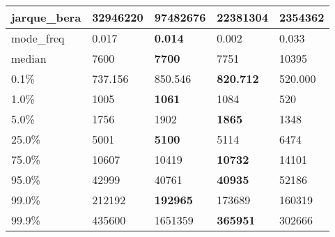 \begin{table}[H]
\begin{tabular}{|l|m{10em}|m{10em}|m{10em}|m{10em}|}
\hline jarque\_bera & 32946220 & \cellcolor[rgb]{0.9, 0.54, 0.52} 97482676 & \bfseries 22381304 & 2354362 \\
\hline mode\_freq & 0.017 & \bfseries 0.014 & 0.002 & \cellcolor[rgb]{0.9, 0.54, 0.52} 0.033 \\
\hline median & 7600 & \bfseries 7700 & 7751 & \cellcolor[rgb]{0.9, 0.54, 0.52} 10395 \\
\hline 0.1\% & 737.156 & 850.546 & \bfseries 820.712 & \cellcolor[rgb]{0.9, 0.54, 0.52} 520.000 \\
\hline 1.0\% & 1005 & \bfseries 1061 & 1084 & \cellcolor[rgb]{0.9, 0.54, 0.52} 520 \\
\hline 5.0\% & 1756 & 1902 & \bfseries 1865 & \cellcolor[rgb]{0.9, 0.54, 0.52} 1348 \\
\hline 25.0\% & 5001 & \bfseries 5100 & 5114 & \cellcolor[rgb]{0.9, 0.54, 0.52} 6474 \\
\hline 75.0\% & 10607 & 10419 & \bfseries 10732 & \cellcolor[rgb]{0.9, 0.54, 0.52} 14101 \\
\hline 95.0\% & 42999 & 40761 & \bfseries 40935 & \cellcolor[rgb]{0.9, 0.54, 0.52} 52186 \\
\hline 99.0\% & 212192 & \bfseries 192965 & 173689 & \cellcolor[rgb]{0.9, 0.54, 0.52} 160319 \\
\hline 99.9\% & 435600 & \cellcolor[rgb]{0.9, 0.54, 0.52} 1651359 & \bfseries 365951 & 302666 \\
\hline
\end{tabular}
\end{table}
